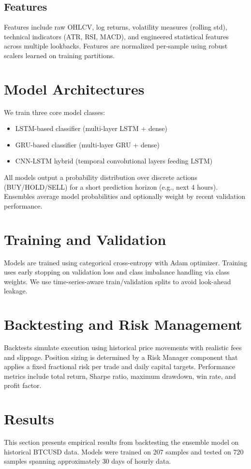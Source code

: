 \documentclass[11pt,a4paper]{article}
\begin{document}
\subsection{Features}
Features include raw OHLCV, log returns, volatility measures (rolling std), technical indicators (ATR, RSI, MACD), and engineered statistical features across multiple lookbacks. Features are normalized per-sample using robust scalers learned on training partitions.

\section{Model Architectures}
We train three core model classes:
\begin{itemize}
    \item LSTM-based classifier (multi-layer LSTM + dense)
    \item GRU-based classifier (multi-layer GRU + dense)
    \item CNN-LSTM hybrid (temporal convolutional layers feeding LSTM)
\end{itemize}
All models output a probability distribution over discrete actions (BUY/HOLD/SELL) for a short prediction horizon (e.g., next 4 hours). Ensembles average model probabilities and optionally weight by recent validation performance.

\section{Training and Validation}
Models are trained using categorical cross-entropy with Adam optimizer. Training uses early stopping on validation loss and class imbalance handling via class weights. We use time-series-aware train/validation splits to avoid look-ahead leakage.

\section{Backtesting and Risk Management}
Backtests simulate execution using historical price movements with realistic fees and slippage. Position sizing is determined by a Risk Manager component that applies a fixed fractional risk per trade and daily capital targets. Performance metrics include total return, Sharpe ratio, maximum drawdown, win rate, and profit factor.

\section{Results}
This section presents empirical results from backtesting the ensemble model on historical BTCUSD data. Models were trained on 207 samples and tested on 720 samples spanning approximately 30 days of hourly data.
\end{document}
